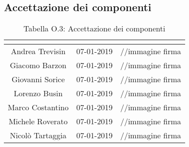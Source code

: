 \subsection{Accettazione dei componenti}
\renewcommand{\arraystretch}{2}
\begin{table}[H]
\begin{center}
  \begin{tabular}{| c | c | c |}
    \hline
    \rowcolor{title_row}
    \textbf{\color{title_text}{Nominativo}} & \textbf{\color{title_text}{Data}} & \textbf{\color{title_text}{Firma}} \\ \hline
    Andrea Trevisin & 07-01-2019 & //immagine firma \\ \hline
    Giacomo Barzon & 07-01-2019 & //immagine firma \\ \hline
    Giovanni Sorice & 07-01-2019 & //immagine firma \\ \hline
    Lorenzo Busin & 07-01-2019 & //immagine firma \\ \hline
    Marco Costantino & 07-01-2019 & //immagine firma \\ \hline
    Michele Roverato & 07-01-2019 & //immagine firma \\ \hline
    Nicolò Tartaggia & 07-01-2019 & //immagine firma \\ 
    \hline
  \end{tabular}
  \caption{Tabella O.3: Accettazione dei componenti\label{}}
\end{center}
\end{table}
\renewcommand{\arraystretch}{1}

